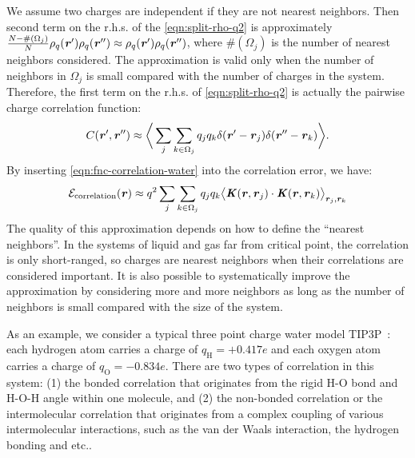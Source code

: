 \documentclass[journal=jacsat,manuscript=article]{achemso}
\newcommand{\recheck}[1]{{\color{black} #1}}
\newcommand{\redc}[1]{{\color{black} #1}}
\renewcommand{\v}[1]{\textbf{\textit{#1}}}
\begin{document}
We assume two charges are independent if they are not nearest neighbors.
Then
second \redc{term} on the r.h.s. of the \ref{eqn:split-rho-q2} is
approximately $\frac{N-\#(\Omega_j)}{N}\rho_q(\v r')\rho_q(\v r'')\approx
\rho_q(\v r')\rho_q(\v r'')$,
where $\#(\Omega_j)$ is the number of nearest neighbors considered.
The approximation is valid only when the number
of neighbors in $\Omega_j$ is small \redc{compared} with the number of charges
in the system.
Therefore, the first \redc{term}
on the r.h.s. of \ref{eqn:split-rho-q2} is actually the
pairwise charge correlation function:
\begin{align}\label{eqn:fnc-correlation-water}
  C(\v r', \v r'') \approx
  \bigg\langle
  \sum_j\sum_{k\in\Omega_j}q_jq_k\delta(\v r' - \v r_j)\delta(\v r'' - \v r_k)
  \bigg\rangle.
\end{align}
By inserting \ref{eqn:fnc-correlation-water} into
the correlation error, we have:
\begin{align}
  \mathcal E_{\textrm{correlation}}(\v r)
  \approx q^2\sum_j\sum_{k\in\Omega_j}q_jq_k
  \big\langle
  \v K(\v r , \v r_j)\cdot\v K(\v r , \v r_k)
  \big\rangle_{\v r_j,\v r_k}
\end{align}
The quality of this approximation depends on how to define the
``nearest neighbors''. In the systems
of liquid and gas far from critical point,
the correlation is only short-ranged, so charges are nearest neighbors when
their correlations are considered important.
It is also possible to systematically
improve the approximation by considering more and more neighbors as long as
the number of neighbors is small \redc{compared} with the size of the system.


As an example, we consider a typical three point charge water model
TIP3P~\cite{jorgensen1983comparison}: each hydrogen atom carries a
charge of $q_{\textrm{H}} = +0.417e$ and each oxygen atom carries a
charge of $q_{\textrm{O}} = -0.834e$.  \recheck{ There are two types
  of correlation in this system: (1) the bonded correlation
  that originates from the rigid H-O
  bond and H-O-H angle within one molecule,
  and (2) the
  non-bonded correlation or the
  intermolecular correlation that originates from
  a complex coupling of various intermolecular interactions, such as
  the van der Waals interaction,
  the hydrogen bonding and etc..
}
\end{document}
